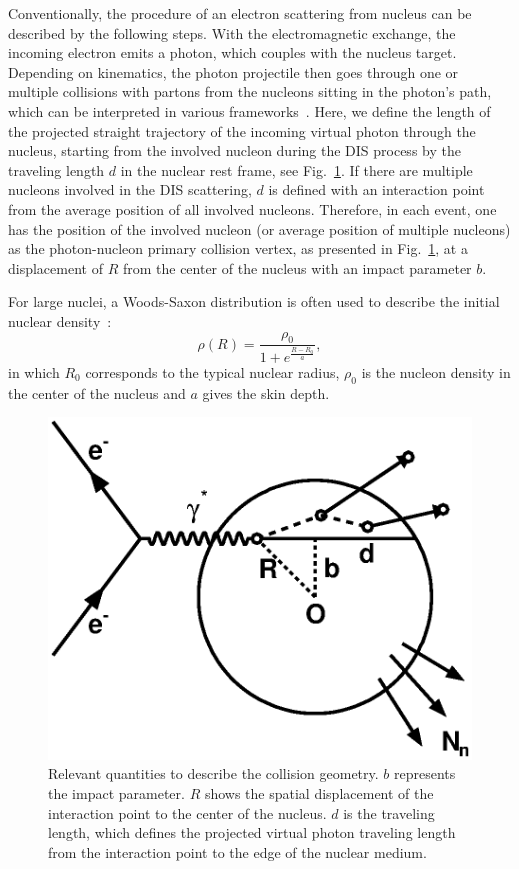 Conventionally, the procedure of an electron scattering from nucleus can be
described by the following steps. With the electromagnetic exchange, the
incoming electron emits a photon, which couples with the nucleus target.
Depending on kinematics, the photon projectile then goes through one or multiple
collisions with partons from the nucleons sitting in the photon's path, which
can be interpreted in various frameworks~\cite{Piller:1995kh}. Here, we define
the length of the projected straight trajectory of the incoming virtual photon
through the nucleus, starting from the involved nucleon during the DIS process
by the traveling length $d$ in the nuclear rest frame, see
Fig.~\ref{fig:geometry}. If there are multiple nucleons involved in the DIS
scattering, $d$ is defined with an interaction point from the average position
of all involved nucleons. Therefore, in each event, one has the position of the
involved nucleon (or average position of multiple nucleons) as the
photon-nucleon primary collision vertex, as presented in
Fig.~\ref{fig:geometry}, at a displacement of $R$ from the center of the nucleus
with an impact parameter $b$.

For large nuclei, a Woods-Saxon distribution is often used to describe the 
initial nuclear density~\cite{Miller:2007ri}:
\begin{equation}
\rho(R)=\frac{\rho_{0}}{1+e^{\frac{R-R_{0}}{a}}},
\label{eqn:woodsaxon}
\end{equation}
in which $R_{0}$ corresponds to the typical nuclear radius, $\rho_{0}$ is the nucleon density in the center of the nucleus and $a$ gives the skin depth.

\begin{figure}
\begin{center}
\includegraphics[width=0.5\columnwidth]{plots/chpt7/geometry_definition.eps}
\caption[A schematic view of the \eA\ collision and the relevant geometric quantity definition] {Relevant quantities to describe the collision geometry. $b$ represents the impact parameter. $R$ shows the spatial displacement of the interaction point to the center of the nucleus. $d$ is the traveling length, which defines the projected virtual photon traveling length from the interaction point to the edge of the nuclear medium.}
\label{fig:geometry}
\end{center}
\end{figure}

